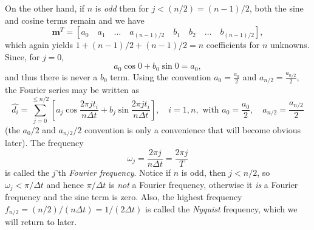 On the other hand, if $n$ is \emph{odd} then for $j < (n/2) = (n-1)/2$, both the sine and cosine terms remain and we have
\begin{equation}
\mathbf{m}^T = \left[ a_0 \quad a_1 \quad \dots \quad  a_{(n-1)/2} \quad b_1 \quad b_2 \quad  \dots \quad b_{(n-1)/2} \right],
\end{equation}
which again yields $1 + (n-1)/2 + (n-1)/2 = n$ coefficients for $n$ unknowns.  Since, for $j = 0$,
\begin{equation}
a_0 \cos 0 + b_0 \sin 0 = a_0,
\end{equation}
and thus there is never a $b_0$ term.  Using the convention $a_0 = \frac{a_0}{2}$ and $a_{n/2} = \frac{a_{n/2}}{2}$,
the Fourier series may be written as
\begin{equation}
\hat{d_i} = \sum^{ \leq n/2}_{j=0} \left[a_j \cos \frac{2 \pi jt_i}{n \Delta t} + b_j \sin \frac {2 \pi j t_i}{n \Delta t} \right],\quad i = 1,n,\mbox{ with } a_0 = \frac{a_0}{2},\quad a_{n/2} = \frac{a_{n/2}}{2}
\end{equation}	 	
(the $a_{0}/2$ and $a_{n/2}/2$ convention is only a convenience that will become obvious later).  The frequency
\begin{equation}
\omega_j = \frac{2 \pi j}{n \Delta t} = \frac{2 \pi j}{T} 
\end{equation}
is called the $j$'th \emph{Fourier frequency}.  Notice if $n$ is odd, then $j < n/2$, so $\omega_j < \pi/\Delta t$ and hence $\pi/\Delta t$ is \emph{not}
a Fourier frequency, otherwise it \emph{is} a 
Fourier frequency and the sine term is zero.  Also, the highest frequency $f_{n/2} = (n/2)/ (n \Delta t) = 1/(2 \Delta t)$ is called the \emph{Nyquist} 
frequency, which we will return to later.
	
